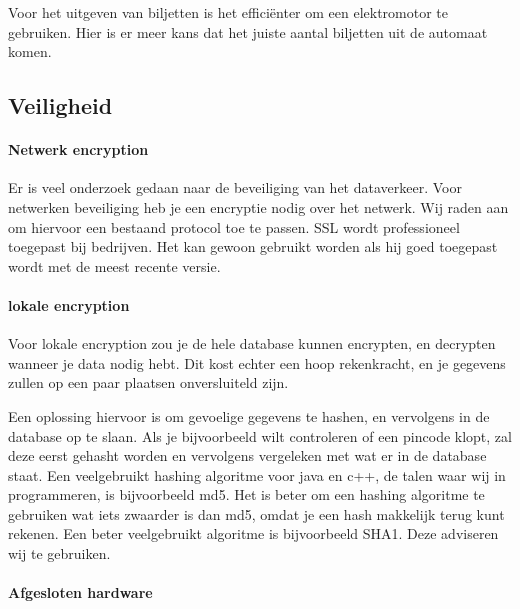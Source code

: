 \documentclass{article}
\begin{document}
Voor het uitgeven van biljetten is het effici\"enter om een elektromotor te gebruiken.
Hier is er meer kans dat het juiste aantal biljetten uit de automaat komen.

\newpage

\subsection{Veiligheid}

\paragraph{Netwerk encryption}

Er is veel onderzoek gedaan naar de beveiliging van het dataverkeer.
Voor netwerken beveiliging heb je een encryptie nodig over het netwerk.
Wij raden aan om hiervoor een bestaand protocol toe te passen.
SSL wordt professioneel toegepast bij bedrijven.
Het kan gewoon gebruikt worden als hij goed toegepast wordt met de meest recente versie.

\paragraph{lokale encryption}

Voor lokale encryption zou je de hele database kunnen encrypten, en decrypten wanneer je data nodig hebt.
Dit kost echter een hoop rekenkracht, en je gegevens zullen op een paar plaatsen onversluiteld zijn.

Een oplossing hiervoor is om gevoelige gegevens te hashen, en vervolgens in de database op te slaan.
Als je bijvoorbeeld wilt controleren of een pincode klopt, zal deze eerst gehasht worden en vervolgens vergeleken met wat er in de database staat.
Een veelgebruikt hashing algoritme voor java en c++, de talen waar wij in programmeren, is bijvoorbeeld md5.
Het is beter om een hashing algoritme te gebruiken wat iets zwaarder is dan md5, omdat je een hash makkelijk terug kunt rekenen.
Een beter veelgebruikt algoritme is bijvoorbeeld SHA1.
Deze adviseren wij te gebruiken.

\hfill

\centerline{  }

\paragraph{Afgesloten hardware}
\end{document}
